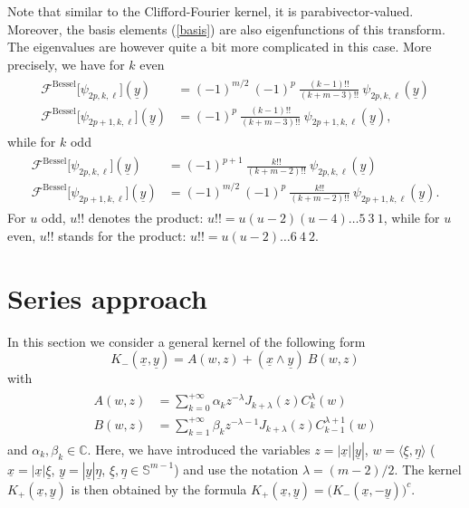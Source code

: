 \documentclass{amsart}
\theoremstyle{remark}
\begin{document}
Note that similar to the Clifford-Fourier kernel, it is parabivector-valued. Moreover, the basis elements (\ref{basis}) are also eigenfunctions of this transform. The eigenvalues are however quite a bit more complicated in this case. More precisely, we have for $k$ even
\begin{align} \label{eigenvalue F-B1}
\begin{split}
{\mathcal{F}}^{\mathrm{Bessel}}\lbrack \psi_{2p,k,\ell}\rbrack({\underline{y}}) &= (-1)^{m/2} \ (-1)^p \ \frac{(k-1)!!}{(k+m-3)!!} \ \psi_{2p,k,\ell}({\underline{y}})\\
{\mathcal{F}}^{\mathrm{Bessel}}\lbrack \psi_{2p+1,k,\ell}\rbrack({\underline{y}}) &= (-1)^p \ \frac{(k-1)!!}{(k+m-3)!!} \ \psi_{2p+1,k,\ell}({\underline{y}}),
\end{split}
\end{align}
while for $k$ odd
\begin{align} \label{eigenvalue F-B2}
\begin{split}
{\mathcal{F}}^{\mathrm{Bessel}}\lbrack \psi_{2p,k,\ell}\rbrack({\underline{y}}) &= (-1)^{p+1} \ \frac{k!!}{(k+m-2)!!} \  \psi_{2p,k,\ell}({\underline{y}})\\
{\mathcal{F}}^{\mathrm{Bessel}}\lbrack \psi_{2p+1,k,\ell}\rbrack({\underline{y}}) &= (-1)^{m/2} \ (-1)^p \ \frac{k!!}{(k+m-2)!!} \ \psi_{2p+1,k,\ell}({\underline{y}}).
\end{split}
\end{align}
For $u$ odd, $u!!$ denotes the product: $u!!=u(u-2)(u-4) \ldots 5 \ 3 \ 1$, while for $u$ even, $u!!$ stands for the product: $u!!=u(u-2) \ldots 6 \ 4 \ 2$.
\section{Series approach}
\setcounter{equation}{0}
\label{Series}

In this section we consider a general kernel of the following form
\begin{equation}\label{structure kernel}
K_{-}({\underline{x}},{\underline{y}}) = A(w,z) + ({\underline{x}} \wedge {\underline{y}}) \  B(w,z)
\end{equation}
with
\begin{align}
\label{seriesconv}
\begin{split}
A(w,z) &= \sum_{k=0}^{+\infty} \alpha_{k}z^{-{{\lambda}}}J_{k+{{\lambda}}}(z) C^{{\lambda}}_{k}(w)\\
B(w,z) &=  \sum_{k=1}^{+\infty} \beta_{k}z^{-{{\lambda}}-1}J_{k+{{\lambda}}}(z) C^{{{\lambda}}+1}_{k-1}(w)
\end{split}
\end{align}
and $\alpha_{k}, \beta_{k} \in {\mathbb{C}}$. Here, we have introduced the variables $z= |{\underline{x}}| |{\underline{y}}|$, $w=\langle \underline{\xi},\underline{\eta} \rangle$ (${\underline{x}} = |{\underline{x}}| \underline{\xi}$, ${\underline{y}} = |{\underline{y}}| \underline{\eta}$, $\underline{\xi},\underline{\eta} \in {\mathbb{S}}^{m-1}$) and use the notation $\lambda=(m-2)/2$. The kernel $K_{+}({\underline{x}},{\underline{y}})$ is then obtained by the formula $K_{+}({\underline{x}},{\underline{y}}) = \bigl( K_{-}({\underline{x}},-{\underline{y}}) \bigr)^c$.
\end{document}
